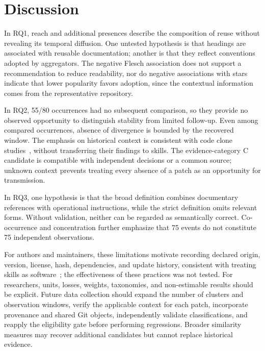 \documentclass[conference]{IEEEtran}
\begin{document}
\section{Discussion}
In RQ1, reach and additional presences describe the composition of reuse without revealing its temporal diffusion. One untested hypothesis is that headings are associated with reusable documentation; another is that they reflect conventions adopted by aggregators. The negative Flesch association does not support a recommendation to reduce readability, nor do negative associations with stars indicate that lower popularity favors adoption, since the contextual information comes from the representative repository.

In RQ2, 55/80 occurrences had no subsequent comparison, so they provide no observed opportunity to distinguish stability from limited follow-up. Even among compared occurrences, absence of divergence is bounded by the recovered window. The emphasis on historical context is consistent with code clone studies~\cite{krinke2007,bettenburg2012}, without transferring their findings to skills. The evidence-category C candidate is compatible with independent decisions or a common source; unknown context prevents treating every absence of a patch as an opportunity for transmission.

In RQ3, one hypothesis is that the broad definition combines documentary references with operational instructions, while the strict definition omits relevant forms. Without validation, neither can be regarded as semantically correct. Co-occurrence and concentration further emphasize that 75 events do not constitute 75 independent observations.

For authors and maintainers, these limitations motivate recording declared origin, version, license, hash, dependencies, and update history, consistent with treating skills as software~\cite{authoring-skills}; the effectiveness of these practices was not tested. For researchers, units, losses, weights, taxonomies, and non-estimable results should be explicit. Future data collection should expand the number of clusters and observation windows, verify the applicable context for each patch, incorporate provenance and shared Git objects, independently validate classifications, and reapply the eligibility gate before performing regressions. Broader similarity measures may recover additional candidates but cannot replace historical evidence.
\end{document}
